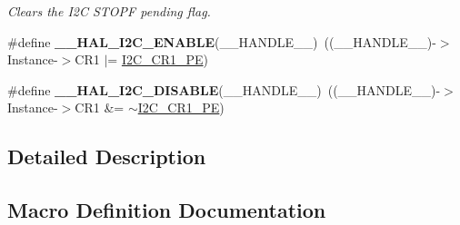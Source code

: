 \begin{DoxyCompactItemize}
\begin{DoxyCompactList}\small\item\em Clears the I2C S\+T\+O\+PF pending flag. \end{DoxyCompactList}\item 
\#define {\bfseries \+\_\+\+\_\+\+H\+A\+L\+\_\+\+I2\+C\+\_\+\+E\+N\+A\+B\+LE}(\+\_\+\+\_\+\+H\+A\+N\+D\+L\+E\+\_\+\+\_\+)~((\+\_\+\+\_\+\+H\+A\+N\+D\+L\+E\+\_\+\+\_\+)-\/$>$Instance-\/$>$C\+R1 $\vert$=  \hyperlink{group___peripheral___registers___bits___definition_ga953b0d38414808db79da116842ed3262}{I2\+C\+\_\+\+C\+R1\+\_\+\+PE})\hypertarget{group___i2_c___exported___macros_gacff412c47b0c1d63ef3b2a07f65988b7}{}\label{group___i2_c___exported___macros_gacff412c47b0c1d63ef3b2a07f65988b7}

\item 
\#define {\bfseries \+\_\+\+\_\+\+H\+A\+L\+\_\+\+I2\+C\+\_\+\+D\+I\+S\+A\+B\+LE}(\+\_\+\+\_\+\+H\+A\+N\+D\+L\+E\+\_\+\+\_\+)~((\+\_\+\+\_\+\+H\+A\+N\+D\+L\+E\+\_\+\+\_\+)-\/$>$Instance-\/$>$C\+R1 \&=  $\sim$\hyperlink{group___peripheral___registers___bits___definition_ga953b0d38414808db79da116842ed3262}{I2\+C\+\_\+\+C\+R1\+\_\+\+PE})\hypertarget{group___i2_c___exported___macros_ga3d6a35da02ca72537a15570912c80412}{}\label{group___i2_c___exported___macros_ga3d6a35da02ca72537a15570912c80412}

\end{DoxyCompactItemize}


\subsection{Detailed Description}


\subsection{Macro Definition Documentation}
